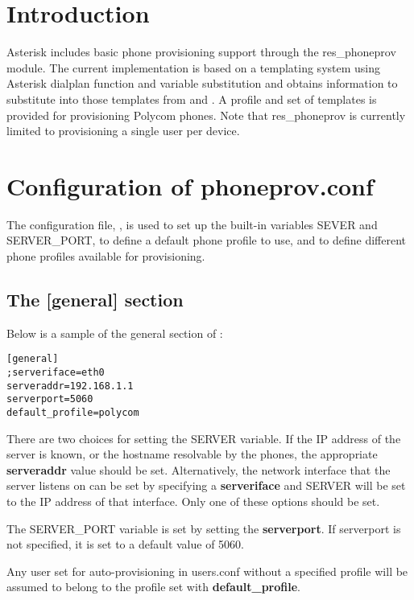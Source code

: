 \section{Introduction}

Asterisk includes basic phone provisioning support through the res\_phoneprov module. The 
current implementation is based on a templating system using Asterisk dialplan function 
and variable substitution and obtains information to substitute into those templates from 
 and .  A profile and set of templates is provided 
for provisioning Polycom phones. Note that res\_phoneprov is currently limited to 
provisioning a single user per device.

\section{Configuration of phoneprov.conf}

The configuration file, , is used to set up the built-in variables 
SEVER and SERVER\_PORT, to define a default phone profile to use, and to define different 
phone profiles available for provisioning.

\subsection{The [general] section}

Below is a sample of the general section of :

\begin{astlisting}
\begin{verbatim}
[general]
;serveriface=eth0
serveraddr=192.168.1.1
serverport=5060
default_profile=polycom
\end{verbatim}
\end{astlisting}

There are two choices for setting the SERVER variable. If the IP address of the server is 
known, or the hostname resolvable by the phones, the appropriate \textbf{serveraddr} 
value should be set.  Alternatively, the network interface that the server listens on can 
be set by specifying a \textbf{serveriface} and SERVER will be set to the IP address of 
that interface.  Only one of these options should be set.

The SERVER\_PORT variable is set by setting the \textbf{serverport}.  If serverport is 
not specified, it is set to a default value of 5060.

Any user set for auto-provisioning in users.conf without a specified profile will be 
assumed to belong to the profile set with \textbf{default\_profile}.

